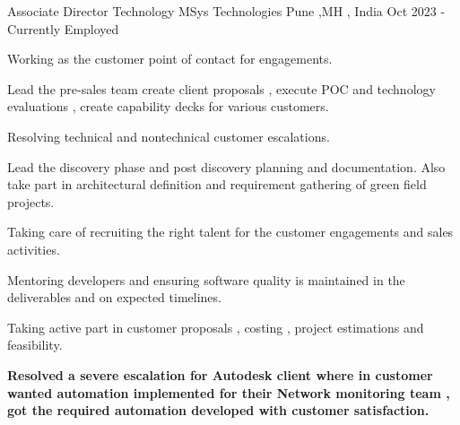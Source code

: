 

\begin{cventries}
  \vspace{5mm}
  \cventry
    {Associate Director Technology}
    {MSys Technologies}
    {Pune ,MH , India}
    {Oct 2023 - Currently Employed}  
    {
      \begin{cvitems}
        \item Working as the customer point of contact for engagements.
        \item Lead the pre-sales team create client proposals , execute POC and technology evaluations , create capability decks for various customers.
        \item Resolving technical and nontechnical customer escalations.
        \item Lead the discovery phase and post discovery planning and documentation. Also take part in architectural definition and requirement gathering of green field projects.
        \item Taking care of recruiting the right talent for the customer engagements and sales activities.
        \item Mentoring developers and ensuring software quality is maintained in the deliverables and on expected timelines.
        \item Taking active part in customer proposals , costing , project estimations and feasibility.
        \item \textbf{Resolved a severe escalation for Autodesk client where in customer wanted automation implemented for their Network monitoring team , got the required automation developed with customer satisfaction.}
      \end{cvitems}
    }
  

\end{cventries}
